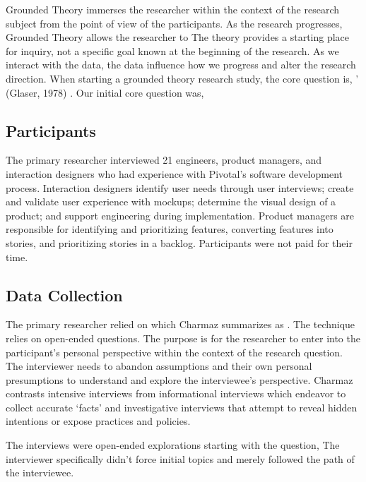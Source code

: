 Grounded Theory immerses the researcher within the context of the research subject from the point of view of the participants. As the research progresses, Grounded Theory allows the researcher to  The theory provides a starting place for inquiry, not a specific goal known at the beginning of the research. As we interact with the data, the data influence how we progress and alter the research direction. When starting a grounded theory research study, the core question is, ' (Glaser, 1978) \cite{GlaserTheoreticalSensitivity}. Our initial core question was, 

\subsection{Participants}
The primary researcher interviewed 21 engineers, product managers, and interaction designers who had experience with Pivotal's software development process. Interaction designers identify user needs through user interviews; create and validate user experience with mockups; determine the visual design of a product; and support engineering during implementation. Product managers are responsible for identifying and prioritizing features, converting features into stories, and prioritizing stories in a backlog.  Participants were not paid for their time. 
\subsection{Data Collection}
The primary researcher relied on  which Charmaz summarizes as  \cite{Charmaz}. The technique relies on open-ended questions. The purpose is for the researcher to enter into the participant's personal perspective within the context of the research question. The interviewer needs to abandon assumptions and their own personal presumptions to understand and explore the interviewee's perspective. Charmaz \cite{Charmaz} contrasts intensive interviews from informational interviews which endeavor to collect accurate `facts' and investigative interviews that attempt to reveal hidden intentions or expose practices and policies. 
 
The interviews were open-ended explorations starting with the question,  The interviewer specifically didn't force initial topics and merely followed the path of the interviewee. 

